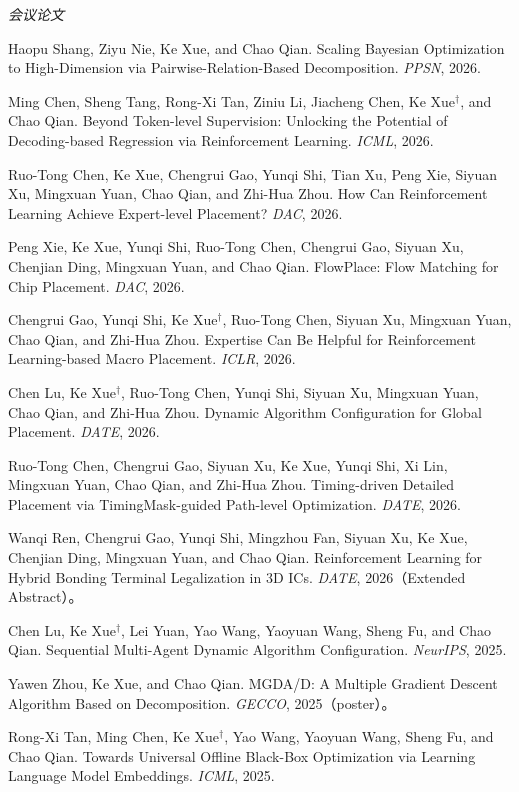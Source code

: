 \documentclass[10pt,a4paper,fontset=fandol]{ctexart}
\begin{document}
\textit{会议论文}
\begin{cvbullet}
  \item Haopu Shang, Ziyu Nie, Ke Xue, and Chao Qian. Scaling Bayesian Optimization to High-Dimension via Pairwise-Relation-Based Decomposition. \textit{PPSN}, 2026.
  \item Ming Chen, Sheng Tang, Rong-Xi Tan, Ziniu Li, Jiacheng Chen, Ke Xue$^\dagger$, and Chao Qian. Beyond Token-level Supervision: Unlocking the Potential of Decoding-based Regression via Reinforcement Learning. \textit{ICML}, 2026.
  \item Ruo-Tong Chen, Ke Xue, Chengrui Gao, Yunqi Shi, Tian Xu, Peng Xie, Siyuan Xu, Mingxuan Yuan, Chao Qian, and Zhi-Hua Zhou. How Can Reinforcement Learning Achieve Expert-level Placement? \textit{DAC}, 2026.
  \item Peng Xie, Ke Xue, Yunqi Shi, Ruo-Tong Chen, Chengrui Gao, Siyuan Xu, Chenjian Ding, Mingxuan Yuan, and Chao Qian. FlowPlace: Flow Matching for Chip Placement. \textit{DAC}, 2026.
  \item Chengrui Gao, Yunqi Shi, Ke Xue$^\dagger$, Ruo-Tong Chen, Siyuan Xu, Mingxuan Yuan, Chao Qian, and Zhi-Hua Zhou. Expertise Can Be Helpful for Reinforcement Learning-based Macro Placement. \textit{ICLR}, 2026.
  \item Chen Lu, Ke Xue$^\dagger$, Ruo-Tong Chen, Yunqi Shi, Siyuan Xu, Mingxuan Yuan, Chao Qian, and Zhi-Hua Zhou. Dynamic Algorithm Configuration for Global Placement. \textit{DATE}, 2026.
  \item Ruo-Tong Chen, Chengrui Gao, Siyuan Xu, Ke Xue, Yunqi Shi, Xi Lin, Mingxuan Yuan, Chao Qian, and Zhi-Hua Zhou. Timing-driven Detailed Placement via TimingMask-guided Path-level Optimization. \textit{DATE}, 2026.
  \item Wanqi Ren, Chengrui Gao, Yunqi Shi, Mingzhou Fan, Siyuan Xu, Ke Xue, Chenjian Ding, Mingxuan Yuan, and Chao Qian. Reinforcement Learning for Hybrid Bonding Terminal Legalization in 3D ICs. \textit{DATE}, 2026（Extended Abstract）。
  \item Chen Lu, Ke Xue$^\dagger$, Lei Yuan, Yao Wang, Yaoyuan Wang, Sheng Fu, and Chao Qian. Sequential Multi-Agent Dynamic Algorithm Configuration. \textit{NeurIPS}, 2025.
  \item Yawen Zhou, Ke Xue, and Chao Qian. MGDA/D: A Multiple Gradient Descent Algorithm Based on Decomposition. \textit{GECCO}, 2025（poster）。
  \item Rong-Xi Tan, Ming Chen, Ke Xue$^\dagger$, Yao Wang, Yaoyuan Wang, Sheng Fu, and Chao Qian. Towards Universal Offline Black-Box Optimization via Learning Language Model Embeddings. \textit{ICML}, 2025.

\end{cvbullet}
\end{document}
